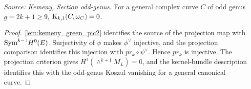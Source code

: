 \begin{theorem}
  \label{thm:kemeny_odd_voisin}
  \textit{Source: Kemeny, Section odd-genus.}
  For a general complex curve \(C\) of odd genus \(g=2k+1\ge9\),
  \(\mathrm{K}_{k,1}(C,\omega_C)=0\).
\end{theorem}
\begin{proof}
  \cref{lem:kemeny_green_pic2} identifies the source of the projection map
  with \(\mathrm{Sym}^{k-1}H^0(E)\).  Surjectivity of \(\phi\) makes
  \(\phi^\vee\) injective, and the projection comparison identifies this
  injection with \(pr_k\circ\psi^\vee\).  Hence \(pr_k\) is injective.  The
  projection criterion gives \(H^1(\wedge^{k+1}M_L)=0\), and the kernel-bundle
  description identifies this with the odd-genus Koszul vanishing for a general
  canonical curve.
\end{proof}
